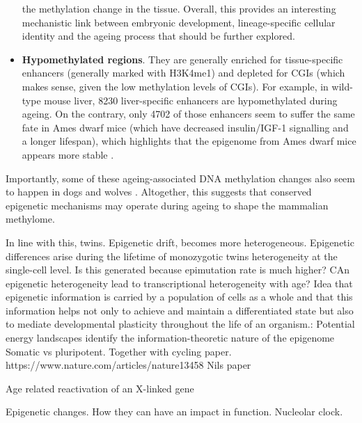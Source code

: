 \begin{itemize}
the methylation change in the tissue. Overall, this provides an interesting mechanistic link between embryonic development, lineage-specific cellular identity and the ageing process that should be further explored.   
	
	\item \textbf{Hypomethylated regions}. They are generally enriched for tissue-specific enhancers (generally marked with H3K4me1) and depleted for \acrshort{CGI}s (which makes sense, given the low methylation levels of CGIs). For example, in wild-type mouse liver, 8230 liver-specific enhancers are hypomethylated during ageing. On the contrary, only 4702 of those enhancers seem to suffer the same fate in Ames dwarf mice (which have decreased insulin/IGF-1 signalling and a longer lifespan), which highlights that the epigenome from Ames dwarf mice appears more stable \cite{Cole2017}.     
	
\end{itemize} 

Importantly, some of these ageing-associated DNA methylation changes also seem to happen in dogs and wolves \cite{Thompson2017}. Altogether, this suggests that conserved epigenetic mechanisms may operate during ageing to shape the mammalian methylome.

\bigskip











In line with this, twins. Epigenetic drift, becomes more heterogeneous.
Epigenetic differences arise during the lifetime of monozygotic twins
heterogeneity at the single-cell level. Is this generated because epimutation rate is much higher?
CAn epigenetic heterogeneity lead to transcriptional heterogeneity with age?
Idea that epigenetic information is carried by a population of cells as a whole and that this information helps not only to achieve and maintain a differentiated state but also to mediate developmental plasticity throughout the life of an organism.: Potential energy landscapes identify the information-theoretic nature of the epigenome
Somatic vs pluripotent. Together with cycling paper. 
https://www.nature.com/articles/nature13458
Nils paper


Age related reactivation of an X-linked gene

\bigskip

Epigenetic changes. How they can have an impact in function. Nucleolar clock. 





